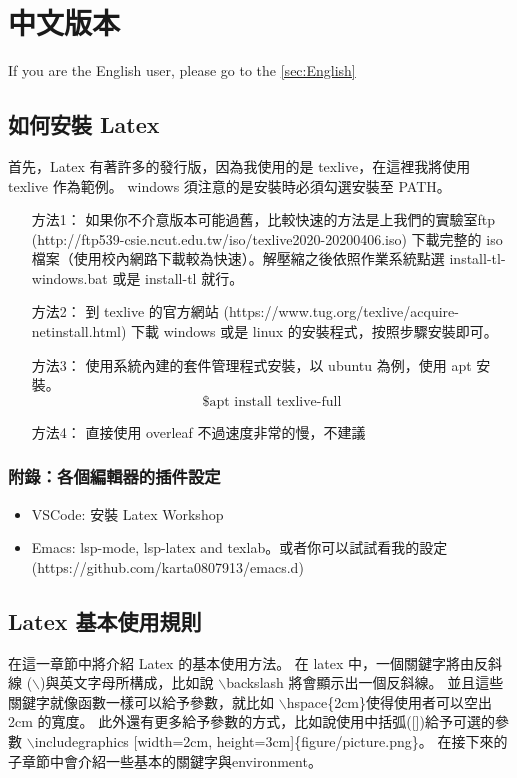 \section{中文版本}\label{sec:Chinese}

If you are the English user, please go to the \ref{sec:English}

\subsection{如何安裝 Latex}

首先，Latex 有著許多的發行版，因為我使用的是 texlive，在這裡我將使用 texlive 作為範例。
windows 須注意的是安裝時必須勾選安裝至 PATH。

\begin{itemize}
	\item [方法1：] 如果你不介意版本可能過舊，比較快速的方法是上我們的實驗室ftp (http://ftp539-csie.ncut.edu.tw/iso/texlive2020-20200406.iso) 下載完整的 iso 檔案（使用校內網路下載較為快速）。解壓縮之後依照作業系統點選 install-tl-windows.bat 或是 install-tl 就行。
	\item [方法2：] 到 texlive 的官方網站 (https://www.tug.org/texlive/acquire-netinstall.html) 下載 windows 或是 linux 的安裝程式，按照步驟安裝即可。
	\item [方法3：] 使用系統內建的套件管理程式安裝，以 ubuntu 為例，使用 apt 安裝。
	      \[\text{\$ apt install texlive-full}\]
	\item [方法4：] 直接使用 overleaf 不過速度非常的慢，不建議
\end{itemize}


\subsubsection{附錄：各個編輯器的插件設定}

\begin{itemize}
	\item VSCode: 安裝 Latex Workshop
	\item Emacs: lsp-mode, lsp-latex and texlab。或者你可以試試看我的設定 \\(https://github.com/karta0807913/emacs.d)
\end{itemize}

\subsection{Latex 基本使用規則}

在這一章節中將介紹 Latex 的基本使用方法。
在 latex 中，一個關鍵字將由反斜線 ($\backslash$)與英文字母所構成，比如說 $\backslash$backslash 將會顯示出一個反斜線。
並且這些關鍵字就像函數一樣可以給予參數，就比如 $\backslash$hspace\{2cm\}使得使用者可以空出 2cm 的寬度。
此外還有更多給予參數的方式，比如說使用中括弧([])給予可選的參數 $\backslash$includegraphics [width=2cm, height=3cm]\{figure/picture.png\}。
在接下來的子章節中會介紹一些基本的關鍵字與environment。

